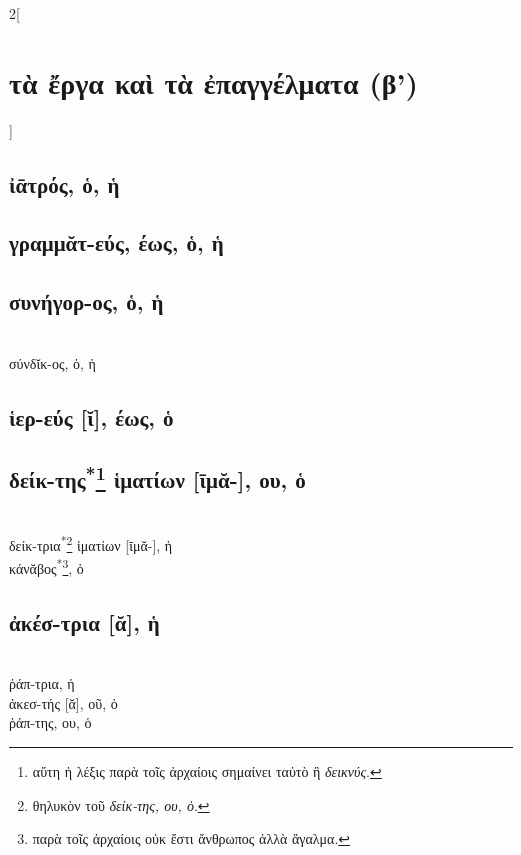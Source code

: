 \documentclass{book}
\begin{document}
\begin{multicols}{2}[\section{τὰ ἔργα καὶ τὰ ἐπαγγέλματα (β')}]
\subsection{ἰᾱτρός, ὁ, ἡ} 
\subsection{γραμμᾰτ-εύς, έως, ὁ, ἡ}
\subsection{συνήγορ-ος, ὁ, ἡ}  ~\\
σύνδῐκ-ος, ὁ, ἡ 
\subsection{ἱερ-εύς [ῐ], έως, ὁ}
\subsection{δείκ-της\textsuperscript{*}\protect\footnote{αὕτη ἡ λέξις παρὰ τοῖς ἀρχαίοις σημαίνει ταὐτὸ ἢ \emph{δεικνύς}.} ἱματίων [ῑμᾰ-], ου, ὁ}
 ~\\
{δείκ-τρια\textsuperscript{*}\footnote{θηλυκὸν τοῦ \emph{δείκ-της, ου, ὁ}.} ἱματίων [ῑμᾰ-], ἡ}
 ~\\
κάνᾰβος\textsuperscript{*}\footnote{παρὰ τοῖς ἀρχαίοις οὐκ ἔστι ἄνθρωπος ἀλλὰ ἅγαλμα.}, ὁ
\subsection{ἀκέσ-τρια [ᾰ], ἡ}  ~\\
ῥάπ-τρια, ἡ  ~\\
ἀκεσ-τής [ᾰ], οῦ, ὁ  ~\\
ῥάπ-της, ου, ὁ 

\end{multicols}
\end{document}
